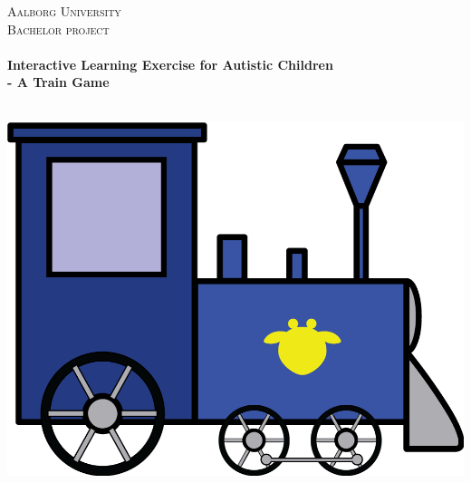 \begin{titlingpage}\centering



\textsc{\LARGE Aalborg University}\\[0.3cm]

\textsc{\Large Bachelor project}\\[0.3cm]

\HRule \\[0.4cm]
{\huge \bfseries Interactive Learning Exercise for Autistic Children}\\[0.5cm]
{\Large \bfseries - A Train Game}

\HRule \\[2cm]

\includegraphics[width=\textwidth]{img/train}

\end{titlingpage}
